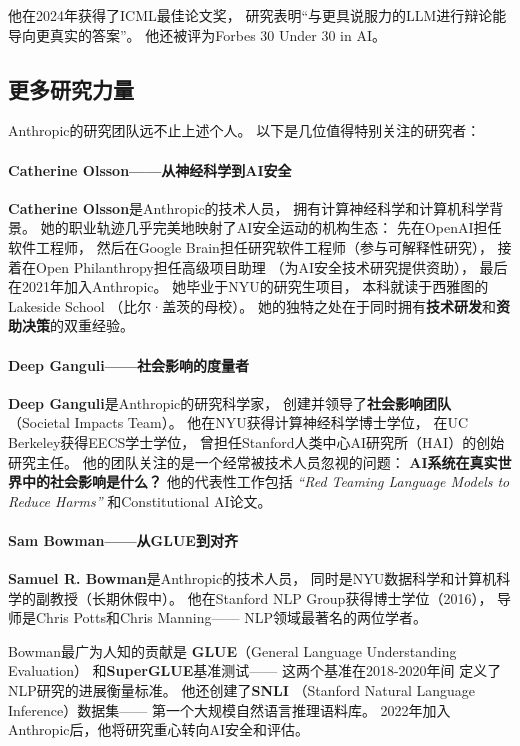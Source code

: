 他在2024年获得了ICML最佳论文奖，
研究表明``与更具说服力的LLM进行辩论能导向更真实的答案''。
他还被评为Forbes 30 Under 30 in AI。

\subsection{更多研究力量}
\label{subsec:more-researchers}

Anthropic的研究团队远不止上述个人。
以下是几位值得特别关注的研究者：

\paragraph{Catherine Olsson——从神经科学到AI安全}
\textbf{Catherine Olsson}是Anthropic的技术人员，
拥有计算神经科学和计算机科学背景。
她的职业轨迹几乎完美地映射了AI安全运动的机构生态：
先在OpenAI担任软件工程师，
然后在Google Brain担任研究软件工程师（参与可解释性研究），
接着在Open Philanthropy担任高级项目助理
（为AI安全技术研究提供资助），
最后在2021年加入Anthropic。
她毕业于NYU的研究生项目，
本科就读于西雅图的Lakeside School
（比尔·盖茨的母校）。
她的独特之处在于同时拥有\textbf{技术研发}和\textbf{资助决策}的双重经验。

\paragraph{Deep Ganguli——社会影响的度量者}
\textbf{Deep Ganguli}是Anthropic的研究科学家，
创建并领导了\textbf{社会影响团队}
（Societal Impacts Team）。
他在NYU获得计算神经科学博士学位，
在UC Berkeley获得EECS学士学位，
曾担任Stanford人类中心AI研究所（HAI）的创始研究主任。
他的团队关注的是一个经常被技术人员忽视的问题：
\textbf{AI系统在真实世界中的社会影响是什么？}
他的代表性工作包括
\textit{``Red Teaming Language Models to Reduce Harms''}
和Constitutional AI论文。

\paragraph{Sam Bowman——从GLUE到对齐}
\textbf{Samuel R. Bowman}是Anthropic的技术人员，
同时是NYU数据科学和计算机科学的副教授（长期休假中）。
他在Stanford NLP Group获得博士学位（2016），
导师是Chris Potts和Chris Manning——
NLP领域最著名的两位学者。

Bowman最广为人知的贡献是
\textbf{GLUE}（General Language Understanding Evaluation）
和\textbf{SuperGLUE}基准测试——
这两个基准在2018-2020年间
定义了NLP研究的进展衡量标准。
他还创建了\textbf{SNLI}
（Stanford Natural Language Inference）数据集——
第一个大规模自然语言推理语料库。
2022年加入Anthropic后，他将研究重心转向AI安全和评估。

